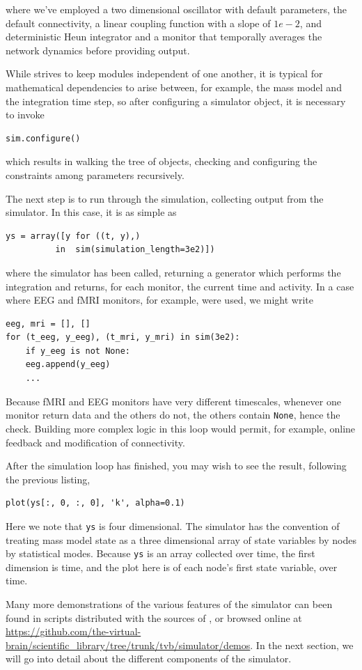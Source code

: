 \noindent where we've employed a two dimensional oscillator
with default parameters, the default connectivity, a linear 
coupling function with a slope of $1e-2$, and deterministic
Heun integrator and a monitor that temporally averages the 
network dynamics before providing output.

While \TVB strives to keep modules independent of one another,
it is typical for mathematical dependencies to arise between, 
for example, the mass model and the integration time step, so
after configuring a simulator object, it is necessary to invoke

\begin{lstlisting}
sim.configure()
\end{lstlisting}

which results in walking the tree of objects, checking and 
configuring the constraints among parameters recursively.

The next step is to run through the simulation, collecting
output from the simulator. In this case, it is as simple as
\begin{lstlisting}
ys = array([y for ((t, y),) 
	      in  sim(simulation_length=3e2)])
\end{lstlisting}
\noindent where the simulator has been called, returning a 
generator which performs the integration and returns, for each
monitor, the current time and activity. In a case where EEG 
and fMRI monitors, for example, were used, we might write
\begin{lstlisting}
eeg, mri = [], []
for (t_eeg, y_eeg), (t_mri, y_mri) in sim(3e2):
    if y_eeg is not None:
	eeg.append(y_eeg)
    ...
\end{lstlisting}
\noindent Because fMRI and EEG monitors have very different
timescales, whenever one monitor return data and the others do
not, the others contain \texttt{None}, hence the check. Building
more complex logic in this loop would permit, for example, online
feedback and modification of connectivity. 

After the simulation loop has finished, you may wish to see the
result, following the previous listing, 
\begin{lstlisting}
plot(ys[:, 0, :, 0], 'k', alpha=0.1)
\end{lstlisting}
\noindent Here we note that \texttt{ys} is four dimensional. The 
simulator has the convention of treating  mass model state as a
three dimensional array of state variables by nodes by statistical
modes. Because \texttt{ys} is an array collected over time, the first
dimension is time, and the plot here is of each node's first state
variable, over time.

Many more demonstrations of the various features of the simulator
can been found in scripts distributed with the sources of \TVB, or 
browsed online at \url{https://github.com/the-virtual-brain/scientific_library/tree/trunk/tvb/simulator/demos}.
In the next section, we will go into detail about the different
components of the simulator.

